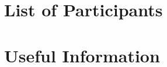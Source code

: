 \documentclass[10pt,a4paper]{scrreprt}
\begin{document}
\chapter{List of Participants}


\chapter{Useful Information}


\newpage

\pagecolor{mpigreen} %
~

\end{document}
